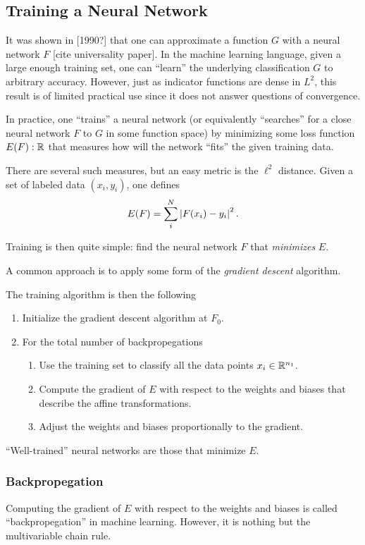 \documentclass[12pt,letterpaper,boxed]{article}
\begin{document}
	\subsection{Training a Neural Network}
	It was shown in [1990?] that one can approximate a function $G$ with a neural network $F$ [cite universality paper]. In the machine learning language, given a large enough training set, one can ``learn'' the underlying classification $G$ to arbitrary accuracy. However, just as indicator functions are dense in $L^2$, this result is of limited practical use since it does not answer questions of convergence.

	In practice, one ``trains'' a neural network (or equivalently ``searches'' for a close neural network $F$ to $G$ in some function space) by minimizing some loss function $E(F) : {\mathbb{R}}$ that measures how will the network ``fits'' the given training data.

	There are several such measures, but an easy metric is the $\ell^2$ distance. Given a set of labeled data $(x_i, y_i)$, one defines
	\[
		E(F) = \sum_i^N \left| F(x_i) - y_i \right|^2.
	\]

	Training is then quite simple: find the neural network $F$ that \textit{minimizes} $E$.

	A common approach is to apply some form of the \textit{gradient descent} algorithm.

	The training algorithm is then the following
	\begin{enumerate}
		\item Initialize the gradient descent algorithm at $F_0$.
		\item For the total number of backpropegations
			\begin{enumerate}
				\item Use the training set to classify all the data points $x_i \in {\mathbb{R}}^{n_1}$.
				\item Compute the gradient of $E$ with respect to the weights and biases that describe the affine transformations.
				\item Adjust the weights and biases proportionally to the gradient.
			\end{enumerate}
	\end{enumerate}

	``Well-trained'' neural networks are those that minimize $E$. 
		\subsubsection{Backpropegation}
		Computing the gradient of $E$ with respect to the weights and biases is called ``backpropegation'' in machine learning. However, it is nothing but the multivariable chain rule. 
\end{document}
